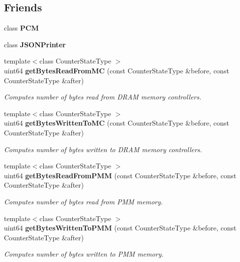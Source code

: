 \subsection*{Friends}
\begin{DoxyCompactItemize}
\item 
\mbox{\label{classUncoreCounterState_ab5f56d2e95ba3daf52c17b8a1d356d64}} 
class {\bfseries P\+CM}
\item 
\mbox{\label{classUncoreCounterState_a9dd7d40a5a10fa8976f8eb55a9889f38}} 
class {\bfseries J\+S\+O\+N\+Printer}
\item 
{\footnotesize template$<$class Counter\+State\+Type $>$ }\\uint64 \textbf{ get\+Bytes\+Read\+From\+MC} (const Counter\+State\+Type \&before, const Counter\+State\+Type \&after)
\begin{DoxyCompactList}\small\item\em Computes number of bytes read from D\+R\+AM memory controllers. \end{DoxyCompactList}\item 
{\footnotesize template$<$class Counter\+State\+Type $>$ }\\uint64 \textbf{ get\+Bytes\+Written\+To\+MC} (const Counter\+State\+Type \&before, const Counter\+State\+Type \&after)
\begin{DoxyCompactList}\small\item\em Computes number of bytes written to D\+R\+AM memory controllers. \end{DoxyCompactList}\item 
{\footnotesize template$<$class Counter\+State\+Type $>$ }\\uint64 \textbf{ get\+Bytes\+Read\+From\+P\+MM} (const Counter\+State\+Type \&before, const Counter\+State\+Type \&after)
\begin{DoxyCompactList}\small\item\em Computes number of bytes read from P\+MM memory. \end{DoxyCompactList}\item 
{\footnotesize template$<$class Counter\+State\+Type $>$ }\\uint64 \textbf{ get\+Bytes\+Written\+To\+P\+MM} (const Counter\+State\+Type \&before, const Counter\+State\+Type \&after)
\begin{DoxyCompactList}\small\item\em Computes number of bytes written to P\+MM memory. \end{DoxyCompactList}\item 

\end{DoxyCompactItemize}

